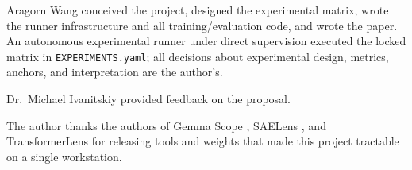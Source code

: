 \documentclass[conference]{IEEEtran}
\begin{document}
Aragorn Wang conceived the project, designed the experimental matrix,
wrote the runner infrastructure and all training/evaluation code, and
wrote the paper. An autonomous experimental runner under direct
supervision executed the locked matrix in \texttt{EXPERIMENTS.yaml}; all
decisions about experimental design, metrics, anchors, and
interpretation are the author's.

Dr.~Michael Ivanitskiy provided feedback on the proposal.

The author thanks the authors of Gemma Scope
\autocite{lieberum2024gemma}, SAELens \autocite{bloom2024saelens}, and
TransformerLens \autocite{nanda2022transformerlens} for releasing tools
and weights that made this project tractable on a single workstation.

\printbibliography
\end{document}
